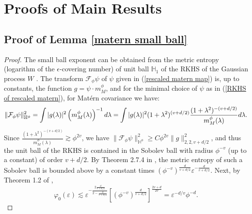 \documentclass[ejs,noshowframe]{imsart}
\theoremstyle{plain}
\theoremstyle{definition}
\theoremstyle{remark}
\begin{document}
\begin{appendix}
\label{appendix} 


\section{Proofs of Main Results}
\subsection{Proof of Lemma \ref{matern small ball}} \label{proof matern small ball}
\begin{proof}
The small ball exponent can be obtained from the metric entropy (logarithm of the $\epsilon$-covering number) of  unit ball $\mathbb{H}_1$ of the RKHS of the Gaussian process $W$  \citep{li1999approximation}. The transform $\mathcal{F}_{\phi} \psi$  of $\psi$  given in (\ref{rescaled matern map}) is, up to constants, the function $g= \psi \cdot {m_{M}^{\phi}}$, and for the minimal choice of $\psi$ as in (\ref{RKHS of rescaled matern}), for Mat\'ern covariance we have:
\begin{displaymath}
\|\mathcal{F}_{\phi} \psi\|_{\mathbb{H}^{\phi}}^2  =\int |g(\lambda)|^2 \left({m_{M}^{\phi}}(\lambda)\right)^{-1} d\lambda\\
=\int |g(\lambda)|^2 (1+\lambda^2)^{(v+d/2)}\frac{(1+\lambda^2)^{-(v+d/2)}}{m_{M}^{\phi}(\lambda)} d\lambda.
\end{displaymath}
Since $\frac{(1+\lambda^2)^{-(v+d/2)}}{m_{M}^{\phi}(\lambda)} \gtrsim \phi^{ 2v}$, we have $\|\mathcal{F}_{\phi} \psi\|_{\mathbb{H}^{\phi}}^2  \geq  C \phi^{2v} \|g\|^2_{2,2,v+d/2}$, and thus the unit ball of the RKHS is contained in the Sobolev ball with radius $\phi^{-v}$ (up to a constant) of order $v+d/2$.  By  Theorem 2.7.4 in \cite{wellner2013weak}, the metric entropy of   such a Sobolev ball is bounded  above by a constant times $(\phi^{-v} )^{\frac{d}{v+d/2}}  \varepsilon^{-\frac{d}{v+d/2}}$. Next, by Theorem 1.2 of \cite{li1999approximation},
\begin{equation} \label{small ball of matern invariation}
    \varphi_0(\varepsilon) \lesssim \varepsilon ^{-\frac{2 \frac{d}{v+d/2}}{2-\frac{d}{v+d/2}}}\left[(\phi^{-v} )^{\frac{d}{v+d/2}} \right]^{\frac{2v+d}{2v}}=\varepsilon^{-d/v} \phi^{-d}.

\end{equation}
\end{proof}
\end{appendix}
\end{document}
